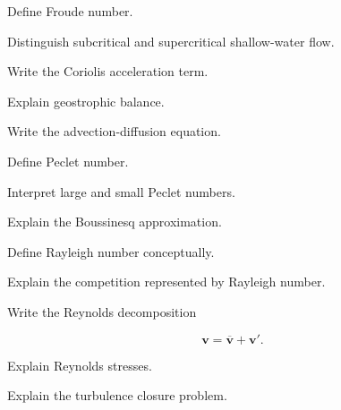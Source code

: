 \begin{exercise}[2]
Define Froude number.
\end{exercise}

\begin{exercise}[3]
Distinguish subcritical and supercritical shallow-water flow.
\end{exercise}

\begin{exercise}[2]
Write the Coriolis acceleration term.
\end{exercise}

\begin{exercise}[3]
Explain geostrophic balance.
\end{exercise}

\begin{exercise}[2]
Write the advection-diffusion equation.
\end{exercise}

\begin{exercise}[2]
Define Peclet number.
\end{exercise}

\begin{exercise}[3]
Interpret large and small Peclet numbers.
\end{exercise}

\begin{exercise}[3]
Explain the Boussinesq approximation.
\end{exercise}

\begin{exercise}[2]
Define Rayleigh number conceptually.
\end{exercise}

\begin{exercise}[3]
Explain the competition represented by Rayleigh number.
\end{exercise}

\begin{exercise}[2]
Write the Reynolds decomposition

\[
\mathbf{v}
=
\overline{\mathbf{v}}
+
\mathbf{v}'.
\]
\end{exercise}

\begin{exercise}[3]
Explain Reynolds stresses.
\end{exercise}

\begin{exercise}[3]
Explain the turbulence closure problem.
\end{exercise}

